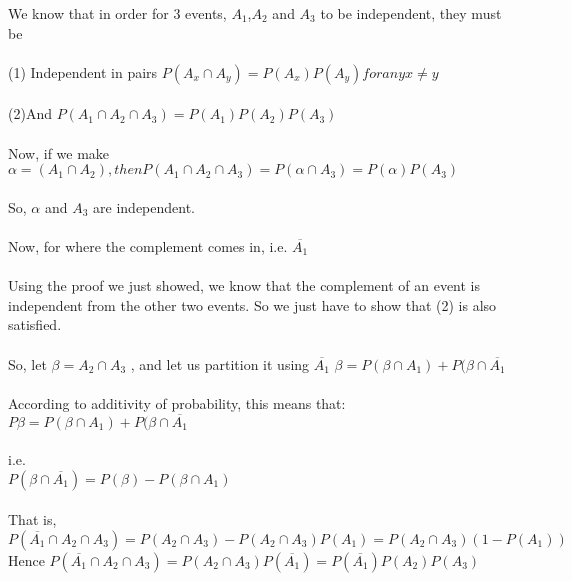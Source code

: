\documentclass{article}
\begin{document}
		We know that in order for 3 events, $A_1$,$A_2$ and $A_3$ to be independent, they must be 
		 \\
		 \\
		 (1) Independent in pairs
		 	$P(A_x \cap A_y) = P(A_x)P(A_y) for any x \ne y$
		 \\
		 \\	
		(2)And
			$P(A_1 \cap A_2 \cap A_3) = P(A_1)P(A_2)P(A_3)$
		\\
		\\	
		Now, if we make $\alpha = (A_1 \cap A_2), then P(A_1 \cap A_2 \cap A_3) = P(\alpha \cap A_3) = P(\alpha)P(A_3)$
		\\
		\\
		So, $\alpha$ and $A_3$ are independent.
		\\
		\\
		Now, for where the complement comes in, i.e. $\overline{A_1}$
		\\
		\\
		Using the proof we just showed, we know that the complement of an event is independent from the other two events.
		So we just have to show that (2) is also satisfied.
		\\
		\\
		So, let $\beta = A_2 \cap A_3$ , and let us partition it using $\overline{A_1}$
		$\beta = P(\beta \cap A_1) + P(\beta \cap \overline{A_1}$
		\\
		\\
		According to additivity of probability, this means that:
		$P\beta = P(\beta \cap A_1) + P(\beta \cap \overline{A_1}$
		\\
		\\
		i.e.
		\\
		$P(\beta \cap \overline{A_1}) = P(\beta) - P(\beta \cap A_1)$
		\\
		\\
		That is,
		$P( \overline{A_1} \cap A_2 \cap A_3) = P(A_2 \cap A_3) - P(A_2 \cap A_3)P(A_1) = P(A_2 \cap A_3)(1-P(A_1))$
		Hence $P(\overline{A_1} \cap A_2 \cap A_3) = P(A_2 \cap A_3)P(\overline{A_1}) = P(\overline{A_1})P(A_2)P(A_3)$
		
\end{document}
